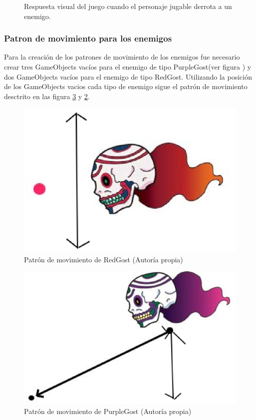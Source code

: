 \begin{figure}
  \centering
  
   

  \caption{Respuesta visual del juego cuando el personaje jugable derrota a un enemigo.}
  \label{figPersonajeResXo}
\end{figure}     
 
 \subsubsection{Patron de movimiento para los enemigos}
 Para la creación de los patrones de movimiento de los enemigos fue necesario  
 crear tres GameObjects vacíos para el enemigo de tipo PurpleGost(ver figura ) y dos 
 GameObjects vacíos para el enemigo de tipo RedGost. Utilizando la posición de los 
 GameObjects vacios cada tipo de enemigo sigue el patrón de movimiento desctrito en las 
 figura \ref{figPurpleGost} y \ref{figRedGost}.  

\begin{figure}
  \centering
   \includegraphics[width=0.4 \textwidth]{05TrabajoRealizado/03Unity/imagenes/disparoRojo}
  \caption{Patrón de movimiento de RedGost (Autoría propia)}
  \label{figRedGost}
\end{figure}

\begin{figure}
  \centering
   \includegraphics[width=0.4 \textwidth]{05TrabajoRealizado/03Unity/imagenes/embestida}
  \caption{Patrón de movimiento de PurpleGost (Autoría propia)}
  \label{figPurpleGost}
\end{figure}